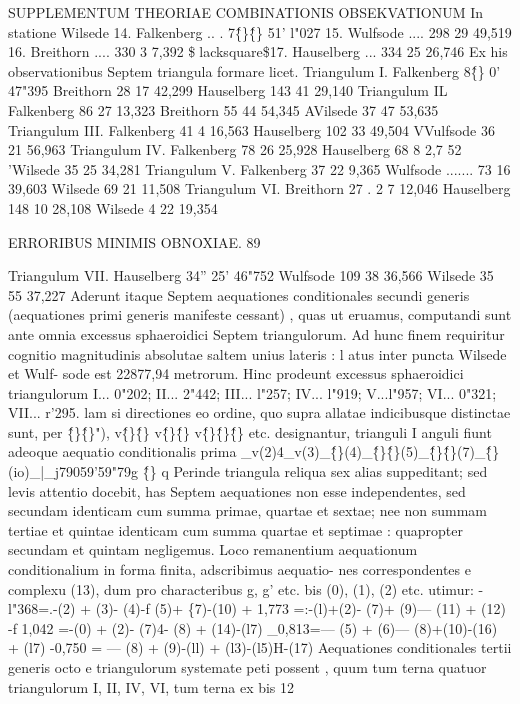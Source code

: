 \documentclass[12pt,a4paper]{article}
\begin{document}
 SUPPLEMENTUM THEORIAE COMBINATIONIS OBSEKVATIONUM
In statione Wilsede
14. Falkenberg .. . 7\^\{\}\^\{\} 51' l"027
15. Wulfsode .... 298 29 49,519
16. Breithorn .... 330 3 7,392
\$lacksquare\$17. Hauselberg ... 334 25 26,746
Ex his observationibus Septem triangula formare licet.
Triangulum I.
Falkenberg 8\^\{\} 0' 47"395
Breithorn 28 17 42,299
Hauselberg 143 41 29,140
Triangulum IL
Falkenberg 86 27 13,323
Breithorn 55 44 54,345
AVilsede 37 47 53,635
Triangulum III.
Falkenberg 41 4 16,563
Hauselberg 102 33 49,504
VVulfsode 36 21 56,963
Triangulum IV.
Falkenberg 78 26 25,928
Hauselberg 68 8 2,7 52
'Wilsede 35 25 34,281
Triangulum V.
Falkenberg 37 22 9,365
Wulfsode ....... 73 16 39,603
Wilsede 69 21 11,508
Triangulum VI.
Breithorn 27 . 2 7 12,046
Hauselberg 148 10 28,108
Wilsede 4 22 19,354

\newpage
\begin{center}
\textsc{ERRORIBUS MINIMIS OBNOXIAE. 89}
\end{center}
Triangulum VII.
Hauselberg 34'' 25' 46"752
Wulfsode 109 38 36,566
Wilsede 35 55 37,227
Aderunt itaque Septem aequationes conditionales secundi generis (aequationes
primi generis manifeste cessant) , quas ut eruamus, computandi sunt ante omnia
excessus sphaeroidici Septem triangulorum. Ad hunc finem requiritur cognitio
magnitudinis absolutae saltem unius lateris : l atus inter puncta Wilsede et Wulf-
sode est 22877,94 metrorum. Hinc prodeunt excessus sphaeroidici triangulorum
I... 0"202; II... 2"442; III... l"257; IV... l"919; V...l"957; VI... 0"321;
VII... r'295.
lam si directiones eo ordine, quo supra allatae indicibusque distinctae sunt,
per \^\{\}\^\{\}"), v\^\{\}\^\{\} v\^\{\}\^\{\} v\^\{\}\^\{\}\^\{\} etc. designantur, trianguli I anguli fiunt
adeoque aequatio conditionalis prima
\_v(2)4\_v(3)\_\^\{\}(4)\_\^\{\}\^\{\}(5)\_\^\{\}\^\{\}(7)\_\^\{\}(io)\_|\_j79059'59"79g \^\{\} q
Perinde triangula reliqua sex alias suppeditant; sed levis attentio docebit, has
Septem aequationes non esse independentes, sed secundam identicam cum summa
primae, quartae et sextae; nee non summam tertiae et quintae identicam cum
summa quartae et septimae : quapropter secundam et quintam negligemus. Loco
remanentium aequationum conditionalium in forma finita, adscribimus aequatio-
nes correspondentes e complexu (13), dum pro characteribus g, g' etc. bis (0),
(1), (2) etc. utimur:
-l"368=.-(2) + (3)- (4)-f (5)+ \{7)-(10)
+ 1,773 =:-(l)+(2)- (7)+ (9)--- (11) + (12)
-f 1,042 =-(0) + (2)- (7)4- (8) + (14)-(l7)
\_0,813=--- (5) + (6)--- (8)+(10)-(16) + (l7)
-0,750 = --- (8) + (9)-(ll) + (l3)-(l5)H-(17)
Aequationes conditionales tertii generis octo e triangulorum systemate peti
possent , quum tum terna quatuor triangulorum I, II, IV, VI, tum terna ex bis
12
\end{document}
